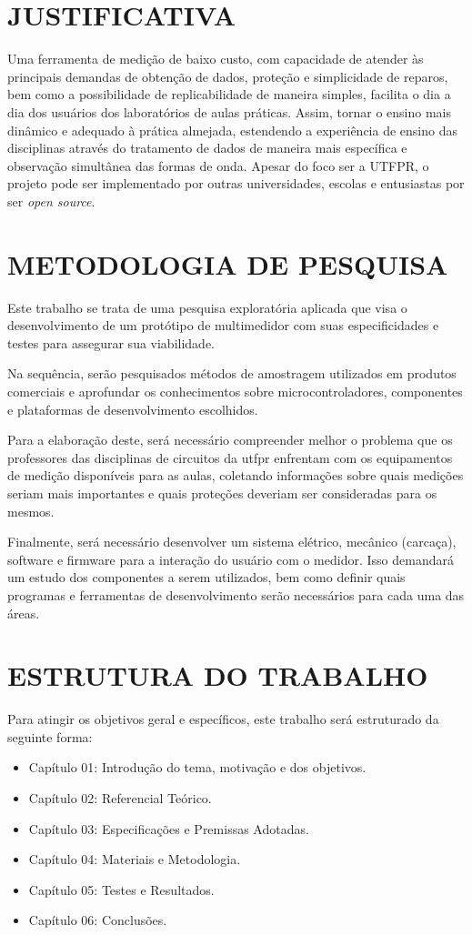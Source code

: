 \section{JUSTIFICATIVA}\label{sec:justificativa}
Uma ferramenta de medição de baixo custo, com capacidade de atender às principais demandas de obtenção de dados, proteção e simplicidade de reparos, bem como a possibilidade de replicabilidade de maneira simples, facilita o dia a dia dos usuários dos laboratórios de aulas práticas. Assim, tornar o ensino mais dinâmico e adequado à prática almejada, estendendo a experiência de ensino das disciplinas através do tratamento de dados de maneira mais específica e observação simultânea das formas de onda.
Apesar do foco ser a UTFPR, o projeto pode ser implementado por outras universidades, escolas e entusiastas por ser \textit{open source}.

\section{METODOLOGIA DE PESQUISA}\label{sec:metodologiapesq}
Este trabalho se trata de uma pesquisa exploratória aplicada que visa o desenvolvimento de um protótipo de multimedidor com suas especificidades e testes para assegurar sua viabilidade.

Na sequência, serão pesquisados métodos de amostragem utilizados em produtos comerciais e aprofundar os conhecimentos sobre microcontroladores, componentes e plataformas de desenvolvimento escolhidos.

Para a elaboração deste, será necessário compreender melhor o problema que os professores das disciplinas de circuitos da \gls{utfpr} enfrentam com os equipamentos de medição disponíveis para as aulas, coletando informações sobre quais medições seriam mais importantes e quais proteções deveriam ser consideradas para os mesmos.

Finalmente, será necessário desenvolver um sistema elétrico, mecânico (carcaça), software e firmware para a interação do usuário com o medidor. Isso demandará um estudo dos componentes a serem utilizados, bem como definir quais programas e ferramentas de desenvolvimento serão necessários para cada uma das áreas.


\section{ESTRUTURA DO TRABALHO}\label{sec:estruturatrab}

Para atingir os objetivos geral e específicos, este trabalho será estruturado da seguinte forma:

\begin{itemize}
    \item Capítulo 01: Introdução do tema, motivação e dos objetivos.
    \item Capítulo 02: Referencial Teórico.
    \item Capítulo 03: Especificações e Premissas Adotadas.
    \item Capítulo 04: Materiais e Metodologia.
    \item Capítulo 05: Testes e Resultados.
    \item Capítulo 06: Conclusões.
\end{itemize}

